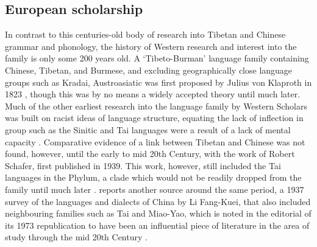 \subsection{European scholarship}
In contrast to this centuries-old body of research into Tibetan and Chinese grammar and phonology, the history of Western research and interest into the family is only some 200 years old. A `Tibeto-Burman' language family containing Chinese, Tibetan, and Burmese, and excluding geographically close language groups such as Kradai, Austroasiatic was first proposed by Julius von Klaproth in 1823 \cite[12]{VanDriem2014}, though this was by no means a widely accepted theory until much later. Much of the other earliest research into the language family by Western Scholars was built on racist ideas of language structure, equating the lack of inflection in group such as the Sinitic and Tai languages were a result of a lack of mental capacity \cite[13]{VanDriem2014}. Comparative evidence of a link between Tibetan and Chinese was not found, however, until the early to mid 20th Century, with the work of Robert Schafer, first published in 1939. This work, however, still included the Tai languages in the Phylum, a clade which would not be readily dropped from the family until much later \cite{Matisoff1991}.  reports another source around the same period, a 1937 survey of the languages and dialects of China by Li Fang-Kuei, that also included neighbouring families such as Tai and Miao-Yao, which is noted in the editorial of its 1973 republication to have been an influential piece of literature in the area of study through the mid 20th Century \cite{Li1973}.

